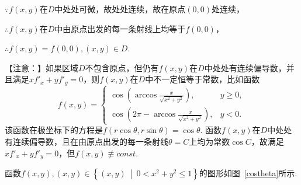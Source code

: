 \documentclass[12pt,UTF8]{ctexart}
\newcommand\Set[2]{\left\{#1\ \middle\vert\ #2 \right\}}
\begin{document}
\begin{enumerate}
$\because f(x,y)$在$D$中处处可微，故处处连续，故在原点$(0,0)$处连续，\footnotemark{}

$\therefore f(x,y)$在$D$中由原点出发的每一条射线上均等于$f(0,0)$，\footnotemark{}

$\therefore f(x,y)=f(0,0),(x,y)\in D$.
%
%
%
%
%
%
%
%
%

【注意：】如果区域$D$不包含原点，但仍有$f(x,y)$在$D$中处处有连续偏导数，并且满足$xf'_x+yf'_y=0$，则$f(x,y)$在$D$中不一定恒等于常数，比如函数
\[f(x,y)=
\begin{cases}
\cos(\arccos\frac x{\sqrt{x^2+y^2}}),&y\geqslant0,\\
\cos(2\pi-\arccos\frac x{\sqrt{x^2+y^2}}),&y<0.
\end{cases}\]
该函数在极坐标下的方程是$f(r\cos\theta,r\sin\theta)=\cos\theta$. 函数$f(x,y)$在$D$中处处有连续偏导数，且在由原点出发的每一条射线$\theta=C$上均为常数$\cos C$，故满足$xf'_x+yf'_y=0$，但$f(x,y)\not\equiv const$. 

函数$f(x,y),(x,y)\in\Set{(x,y)}{0<x^2+y^2\leqslant1}$的图形如图~\ref{costheta}所示.


\end{enumerate}
\end{document}
